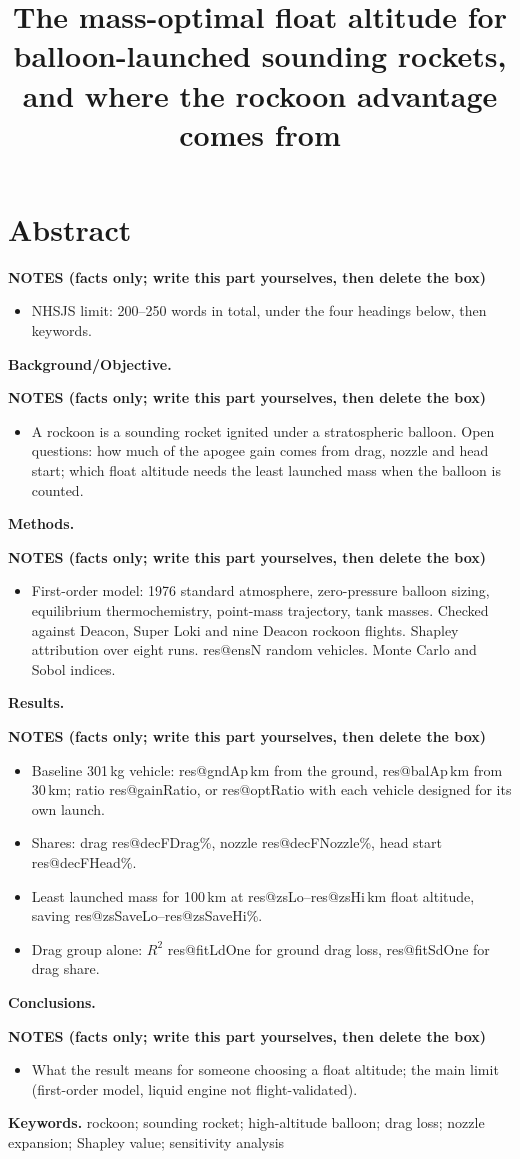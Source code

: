 \documentclass[12pt,a4paper]{article}
\title{\textbf{The mass-optimal float altitude for balloon-launched sounding rockets, and where the rockoon advantage comes from}}
\author{}  %
\date{}
\makeatletter
\newcommand{\R}[1]{\csname res@#1\endcsname}
\newenvironment{notes}{\begin{shaded}\small\textbf{NOTES (facts only; write this part yourselves, then delete the box)}\begin{itemize}}{\end{itemize}\end{shaded}}
\makeatother
\begin{document}
\maketitle

\section*{Abstract}
\begin{notes}
\item NHSJS limit: 200--250 words in total, under the four headings below, then keywords.
\end{notes}
\noindent\textbf{Background/Objective.}
\begin{notes}
\item A rockoon is a sounding rocket ignited under a stratospheric balloon. Open questions: how much of the apogee gain comes from drag, nozzle and head start; which float altitude needs the least launched mass when the balloon is counted.
\end{notes}
\noindent\textbf{Methods.}
\begin{notes}
\item First-order model: 1976 standard atmosphere, zero-pressure balloon sizing, equilibrium thermochemistry, point-mass trajectory, tank masses. Checked against Deacon, Super Loki and nine Deacon rockoon flights. Shapley attribution over eight runs. \R{ensN} random vehicles. Monte Carlo and Sobol indices.
\end{notes}
\noindent\textbf{Results.}
\begin{notes}
\item Baseline 301\,kg vehicle: \R{gndAp}\,km from the ground, \R{balAp}\,km from 30\,km; ratio \R{gainRatio}, or \R{optRatio} with each vehicle designed for its own launch.
\item Shares: drag \R{decFDrag}\%, nozzle \R{decFNozzle}\%, head start \R{decFHead}\%.
\item Least launched mass for 100\,km at \R{zsLo}--\R{zsHi}\,km float altitude, saving \R{zsSaveLo}--\R{zsSaveHi}\%.
\item Drag group alone: $R^2$ \R{fitLdOne} for ground drag loss, \R{fitSdOne} for drag share.
\end{notes}
\noindent\textbf{Conclusions.}
\begin{notes}
\item What the result means for someone choosing a float altitude; the main limit (first-order model, liquid engine not flight-validated).
\end{notes}
\noindent\textbf{Keywords.} rockoon; sounding rocket; high-altitude balloon; drag loss; nozzle expansion; Shapley value; sensitivity analysis
\end{document}

